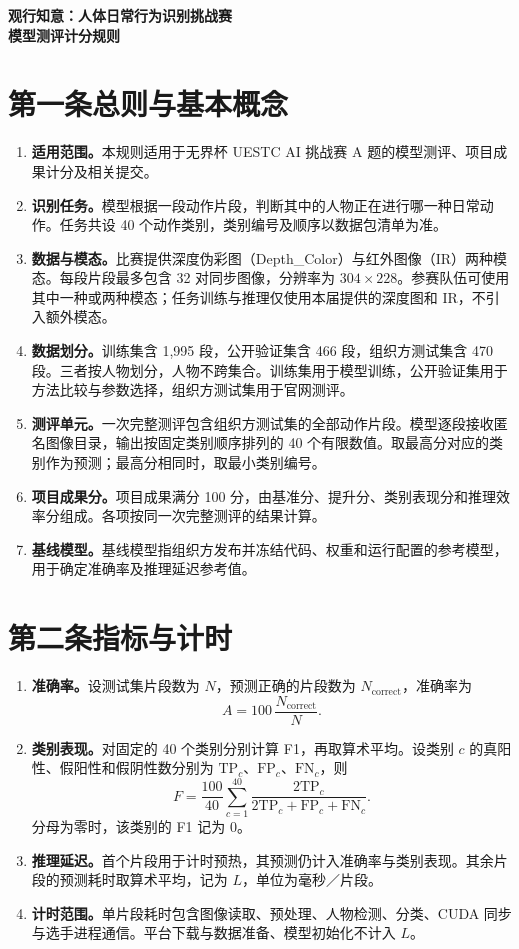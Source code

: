 \documentclass[UTF8,a4paper,12pt,fontset=windows]{ctexart}
\newcommand{\article}[2]{\section*{\centering 第#1条\quad #2}\markboth{第#1条\quad #2}{}}
\begin{document}
\thispagestyle{plain}
\vspace*{7mm}
\begin{center}
{\Large\bfseries 观行知意：人体日常行为识别挑战赛}\\[5pt]
{\large\bfseries 模型测评计分规则}
\end{center}
\vspace{8mm}
\article{一}{总则与基本概念}
\begin{enumerate}
\item \textbf{适用范围。}本规则适用于无界杯 UESTC AI 挑战赛 A 题的模型测评、项目成果计分及相关提交。
\item \textbf{识别任务。}模型根据一段动作片段，判断其中的人物正在进行哪一种日常动作。任务共设 40 个动作类别，类别编号及顺序以数据包清单为准。
\item \textbf{数据与模态。}比赛提供深度伪彩图（Depth\_Color）与红外图像（IR）两种模态。每段片段最多包含 32 对同步图像，分辨率为 $304\times228$。参赛队伍可使用其中一种或两种模态；任务训练与推理仅使用本届提供的深度图和 IR，不引入额外模态。
\item \textbf{数据划分。}训练集含 1,995 段，公开验证集含 466 段，组织方测试集含 470 段。三者按人物划分，人物不跨集合。训练集用于模型训练，公开验证集用于方法比较与参数选择，组织方测试集用于官网测评。
\item \textbf{测评单元。}一次完整测评包含组织方测试集的全部动作片段。模型逐段接收匿名图像目录，输出按固定类别顺序排列的 40 个有限数值。取最高分对应的类别作为预测；最高分相同时，取最小类别编号。
\item \textbf{项目成果分。}项目成果满分 100 分，由基准分、提升分、类别表现分和推理效率分组成。各项按同一次完整测评的结果计算。
\item \textbf{基线模型。}基线模型指组织方发布并冻结代码、权重和运行配置的参考模型，用于确定准确率及推理延迟参考值。
\end{enumerate}


\article{二}{指标与计时}
\begin{enumerate}
\item \textbf{准确率。}设测试集片段数为 $N$，预测正确的片段数为 $N_{\mathrm{correct}}$，准确率为
\[
 A=100\,\frac{N_{\mathrm{correct}}}{N}.
\]
\item \textbf{类别表现。}对固定的 40 个类别分别计算 F1，再取算术平均。设类别 $c$ 的真阳性、假阳性和假阴性数分别为 $\mathrm{TP}_c$、$\mathrm{FP}_c$、$\mathrm{FN}_c$，则
\[
 F=\frac{100}{40}\sum_{c=1}^{40}
 \frac{2\mathrm{TP}_c}{2\mathrm{TP}_c+\mathrm{FP}_c+\mathrm{FN}_c}.
\]
分母为零时，该类别的 F1 记为 0。
\item \textbf{推理延迟。}首个片段用于计时预热，其预测仍计入准确率与类别表现。其余片段的预测耗时取算术平均，记为 $L$，单位为毫秒／片段。
\item \textbf{计时范围。}单片段耗时包含图像读取、预处理、人物检测、分类、CUDA 同步与选手进程通信。平台下载与数据准备、模型初始化不计入 $L$。
\end{enumerate}
\end{document}
